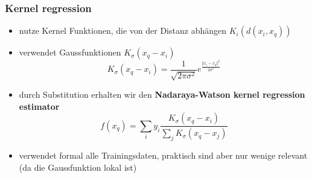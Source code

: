 	\subsubsection{Kernel regression}
	\begin{itemize}
		\item nutze Kernel Funktionen, die von der Distanz abhängen	$K_i(d(x_i,x_q))$
		\item verwendet Gaussfunktionen $K_\sigma(x_q-x_i)$
		\begin{equation*}
			K_\sigma(x_q-x_i) = \frac{1}{\sqrt{2\pi\sigma^2}}e^{\frac{\Vert x_i-x_q\Vert^2}{2\sigma^2}}
		\end{equation*}
		\item durch Substitution erhalten wir den \textbf{Nadaraya-Watson kernel regression estimator}
		\begin{equation*}
			f(x_q) = \sum_i y_i \frac{K_\sigma(x_q-x_i)}{\sum_j K_\sigma(x_q-x_j)}
		\end{equation*}
		\item verwendet formal alle Trainingsdaten, praktisch sind aber nur wenige relevant (da die Gaussfunktion lokal ist)
	\end{itemize}
